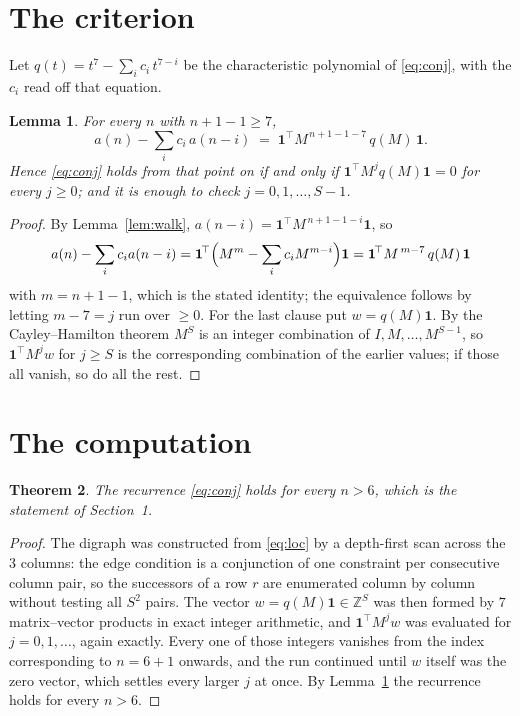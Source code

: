 \documentclass[11pt,a4paper]{article}
\theoremstyle{plain}
\newtheorem{theorem}{Theorem}
\newtheorem{lemma}[theorem]{Lemma}
\theoremstyle{definition}
\begin{document}
\section{The criterion}

Let $q(t)=t^{7}-\sum_i c_i\,t^{7-i}$ be the characteristic polynomial of
\eqref{eq:conj}, with the $c_i$ read off that equation.

\begin{lemma}\label{lem:crit}
For every $n$ with $n+1-1\ge7$,
\[
a(n)-\sum_i c_i\,a(n-i)\;=\;\mathbf{1}^{\!\top}M^{\,n+1-1-7}\,q(M)\,\mathbf{1} .
\]
Hence \eqref{eq:conj} holds from that point on if and only if
$\mathbf{1}^{\!\top}M^{j}q(M)\mathbf{1}=0$ for every $j\ge0$; and it is enough to check
$j=0,1,\dots,S-1$.
\end{lemma}

\begin{proof}
By Lemma~\ref{lem:walk}, $a(n-i)=\mathbf{1}^{\!\top}M^{\,n+1-1-i}\mathbf{1}$, so
\[
a(n)-\sum_i c_i a(n-i)
=\mathbf{1}^{\!\top}\Bigl(M^{m}-\sum_i c_i M^{m-i}\Bigr)\mathbf{1}
=\mathbf{1}^{\!\top}M^{\,m-7}\,q(M)\,\mathbf{1}
\]
with $m=n+1-1$, which is the stated identity; the equivalence follows by letting
$m-7=j$ run over $\ge0$. For the last clause put $w=q(M)\mathbf{1}$. By the
Cayley--Hamilton theorem $M^{S}$ is an integer combination of $I,M,\dots,M^{S-1}$, so
$\mathbf{1}^{\!\top}M^{j}w$ for $j\ge S$ is the corresponding combination of the earlier
values; if those all vanish, so do all the rest.
\end{proof}

\section{The computation}

\begin{theorem}
The recurrence \eqref{eq:conj} holds for every $n>6$, which is the statement of
Section~1.
\end{theorem}

\begin{proof}
The digraph was constructed from \eqref{eq:loc} by a depth-first scan across the $3$
columns: the edge condition is a conjunction of one constraint per consecutive column
pair, so the successors of a row $r$ are enumerated column by column without testing all
$S^2$ pairs. The vector $w=q(M)\mathbf{1}\in\mathbb{Z}^{S}$ was then formed by $7$
matrix--vector products in exact integer arithmetic, and $\mathbf{1}^{\!\top}M^{j}w$ was
evaluated for $j=0,1,\dots$, again exactly. Every one of those integers vanishes from the
index corresponding to $n=6+1$ onwards, and the run continued until $w$ itself was the
zero vector, which settles every larger $j$ at once. By Lemma~\ref{lem:crit} the recurrence
holds for every $n>6$.
\end{proof}
\end{document}
